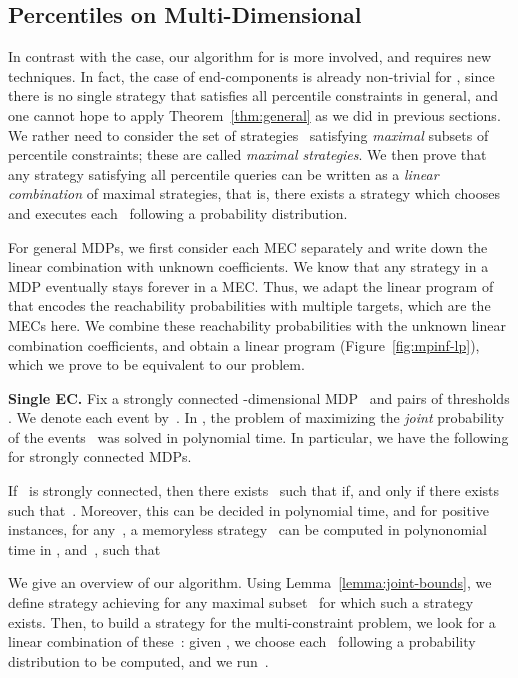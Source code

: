 \documentclass{llncs}
\begin{document}
\subsection{Percentiles on Multi-Dimensional }
\label{section:multidim-mpinf}

In contrast with the  case, our algorithm for  is more involved, and requires new techniques.
In fact, the case of end-components is already non-trivial for , since there is no single strategy 
that satisfies all percentile constraints in general, and one cannot hope to apply Theorem~\ref{thm:general} as we did in previous sections.
We rather need to consider the set of strategies~ satisfying \emph{maximal} subsets of percentile constraints; these are called \emph{maximal strategies}.
We then prove that any strategy satisfying all percentile queries can be written as a \emph{linear combination} of maximal strategies, that is,
there exists a strategy which chooses and executes each~ following a probability distribution.

For general MDPs, 
we first consider each MEC separately and write down the linear combination with unknown coefficients.
We know that any strategy in a MDP eventually stays forever in a MEC. Thus, we adapt the linear program
of~\cite{EKVY-lmcs08} that encodes the reachability probabilities with multiple targets, which are the MECs here.
We combine these reachability probabilities with the unknown linear combination coefficients, and obtain a linear program 
(Figure~\ref{fig:mpinf-lp}), which we prove to be equivalent to our problem.

\smallskip\noindent\textbf{Single EC.}
Fix a strongly connected -dimensional MDP~ and 
pairs of thresholds . We denote each event by~.
In \cite{BBCFK-lmcs14}, the problem of maximizing the \emph{joint} probability of the events~ was solved in polynomial time.
In particular, we have the following for strongly connected MDPs.
\begin{lemma}
  \label{lemma:joint-bounds}
	If~ is strongly connected, then there exists~ such that  if, and only if
    there exists~ such that~.
    Moreover, this can be decided in polynomial time, and for positive instances, for any~,
    a memoryless strategy~ can be computed in polynonomial time in ,  and~, such that
    
\end{lemma}

We give an overview of our algorithm.
Using Lemma~\ref{lemma:joint-bounds}, we define strategy  achieving 
for any maximal subset~ for which such a strategy exists.
Then, to build a strategy for the multi-constraint problem, we look for a linear combination of these~: given , we choose each~ following a probability distribution to be computed, and we run~.
\end{document}
